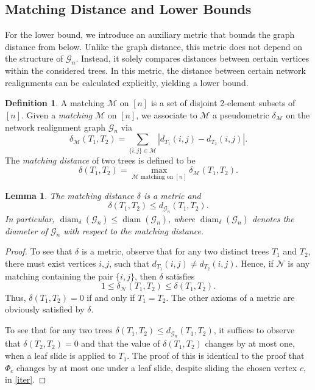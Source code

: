 \documentclass[reqno,dvipsnames]{amsart}
\theoremstyle{plain}
\newtheorem{lemma}[theorem]{Lemma}
\numberwithin{equation}{section}
\theoremstyle{definition}
\newtheorem{definition}[theorem]{Definition}
\begin{document}
\subsection{Matching Distance and Lower Bounds}

For the lower bound, we introduce an auxiliary metric that bounds the graph distance from below. Unlike the graph distance, this metric does not depend on the structure of $\mathcal{G}_n$. Instead, it solely compares distances between certain vertices within the considered trees. In this metric, the distance between certain network realignments can be calculated explicitly, yielding a lower bound.

\begin{definition}
	A matching $\mathcal{M}$ on $[n]$ is a set of disjoint 2-element subsets of $[n]$. Given a \textit{matching} $\mathcal{M}$ on $[n]$, we associate to $\mathcal{M}$ a pseudometric $\delta_\mathcal{M}$ on the network realignment graph $\mathcal{G}_n$ via
	\[
	\delta_\mathcal{M}(T_1,T_2) = \sum_{\{i,j\}\in \mathcal{M}} |d_{T_1}(i,j)-d_{T_2}(i,j)|.
	\] 
	The \textit{matching distance} of two trees is defined to be
	\[
	\delta(T_1,T_2) = \max_{\mathcal{M} \text{ matching on }[n]} \delta_\mathcal{M}(T_1,T_2).
	\]
\end{definition}

\begin{lemma}\label{lem:matchingdist}
	The matching distance $\delta$ is a metric and 
	\[
	\delta(T_1,T_2)\leq d_{\mathcal{G}_n}(T_1,T_2).
	\]
	In particular, $\operatorname{diam}_\delta(\mathcal{G}_n)\leq \operatorname{diam}(\mathcal{G}_n)$, where $\operatorname{diam}_\delta(\mathcal{G}_n)$ denotes the diameter of $\mathcal{G}_n$ with respect to the matching distance.
\end{lemma}

\begin{proof}
	To see that $\delta$ is a metric, observe that for any two distinct trees $T_1$ and $T_2$, there must exist vertices $i,j$, such that $d_{T_1}(i,j)\neq d_{T_2}(i,j)$. Hence, if $\mathcal{N}$ is any matching containing the pair $\{i,j\}$, then $\delta$ satisfies
	\[
	1\leq \delta_\mathcal{N}(T_1,T_2)\leq \delta(T_1,T_2).
	\]
	Thus,
	$\delta(T_1,T_2) = 0$ if and only if $T_1 = T_2$. The other axioms of a metric are obviously satisfied by $\delta$.

	To see that for any two trees $\delta(T_1,T_2)\leq d_{\mathcal{G}_n}(T_1,T_2)$, it suffices to observe that $\delta(T_2,T_2) = 0$ and that the value of $\delta(T_1,T_2)$ changes by at most one, when a leaf slide is applied to $T_1$. The proof of this is identical to the proof that $\Phi_c$ changes by at most one under a leaf slide, despite sliding the chosen vertex $c$, in \autoref{iter}.
\end{proof}
\end{document}
